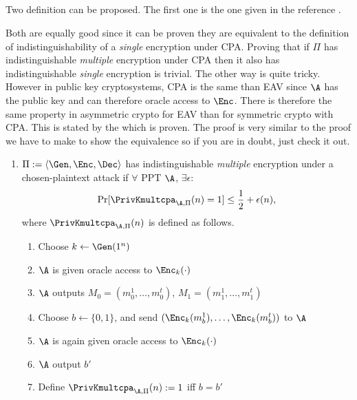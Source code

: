 \subsection{}
\begin{solution}
  Two definition can be proposed.
  The first one is the one given in the reference \cite[p.~84]{katz2007introduction}.

  Both are equally good since it can be proven they are equivalent to the definition of indistinguishability of a \emph{single} encryption
  under CPA.
  Proving that if $\Pi$ has indistinguishable \emph{multiple} encryption under CPA then it also has indistinguishable \emph{single} encryption
  is trivial.
  The other way is quite tricky.
  However in public key cryptosystems, CPA is the same than EAV since $\A$ has the public key and can therefore oracle access to $\Enc$.
  There is therefore the same property in asymmetric crypto for EAV than for symmetric crypto with CPA.
  This is stated by the \cite[theorem~10.10]{katz2007introduction} which is proven.
  The proof is very similar to the proof we have to make to show the equivalence so if you are in doubt, just check it out.

  \begin{enumerate}

    \item
      $\Pi := \langle\Gen, \Enc, \Dec\rangle$ has indistinguishable \emph{multiple} encryption under a chosen-plaintext attack
      if $\forall$ PPT $\A$, $\exists \epsilon$:
      \[ \Pr[\PrivKmultcpa_{\A,\Pi}(n) = 1] \leq \frac{1}{2} + \epsilon(n), \]
      where $\PrivKmultcpa_{\A,\Pi}(n)$ is defined as follows.
      \begin{enumerate}
        \item Choose $k \leftarrow \Gen(1^n)$
        \item $\A$ is given oracle access to $\Enc_k(\cdot)$
        \item $\A$ outputs $M_0 = (m_0^1, \ldots, m_0^t)$, $M_1 = (m_1^1, \ldots, m_1^t)$
        \item Choose $b \leftarrow \{0,1\}$, and send $(\Enc_k(m_b^1), \ldots, \Enc_k(m_b^t))$ to $\A$
        \item $\A$ is again given oracle access to $\Enc_k(\cdot)$
        \item $\A$ output $b'$
        \item Define $\PrivKmultcpa_{\A,\Pi}(n) := 1$ iff $b = b'$
      \end{enumerate}
	


\end{enumerate}
\end{solution}
